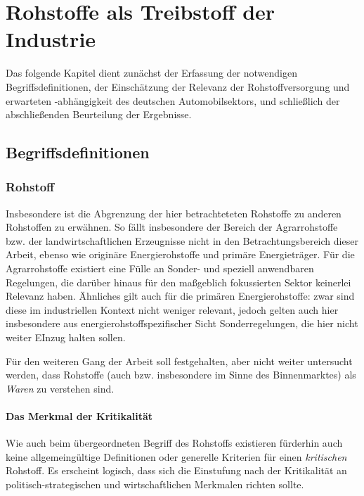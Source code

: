 \documentclass[12pt,a4paper,oneside]{book} %
\begin{document}
	
	
	\chapter{Rohstoffe als Treibstoff der Industrie}
	
	Das folgende Kapitel dient zunächst der Erfassung der notwendigen Begriffsdefinitionen, der Einschätzung der Relevanz der Rohstoffversorgung und erwarteten -abhängigkeit des deutschen Automobilsektors, und schließlich der abschließenden Beurteilung der Ergebnisse.
	
	\section{Begriffsdefinitionen}
	
	\subsection{Rohstoff}
	
	
 Insbesondere ist die Abgrenzung der hier betrachteteten Rohstoffe zu anderen Rohstoffen zu erwähnen. So fällt insbesondere der Bereich der Agrarrohstoffe bzw. der landwirtschaftlichen Erzeugnisse nicht in den Betrachtungsbereich dieser Arbeit, ebenso wie originäre Energierohstoffe und primäre Energieträger. Für die Agrarrohstoffe existiert eine Fülle an Sonder- und speziell anwendbaren Regelungen, die darüber hinaus für den maßgeblich fokussierten Sektor keinerlei Relevanz haben. Ähnliches gilt auch für die primären Energierohstoffe: zwar sind diese im industriellen Kontext nicht weniger relevant, jedoch gelten auch hier insbesondere aus energierohstoffspezifischer Sicht Sonderregelungen, die hier nicht weiter EInzug halten sollen.
	
	
	Für den weiteren Gang der Arbeit soll festgehalten, aber nicht weiter untersucht werden, dass Rohstoffe (auch bzw. insbesondere im Sinne des Binnenmarktes) als \textit{Waren} zu verstehen sind.\autocite{Schorkopf, Rohstoffverwaltung, Rn. 6ff.}
	
	
\subsubsection{Das Merkmal der Kritikalität}
	Wie auch beim übergeordneten Begriff des Rohstoffs existieren fürderhin auch keine allgemeingültige Definitionen oder generelle Kriterien für einen \textit{kritischen} Rohstoff. Es erscheint logisch, dass sich die Einstufung nach der Kritikalität an politisch-strategischen und wirtschaftlichen Merkmalen richten sollte.
	
\end{document}
